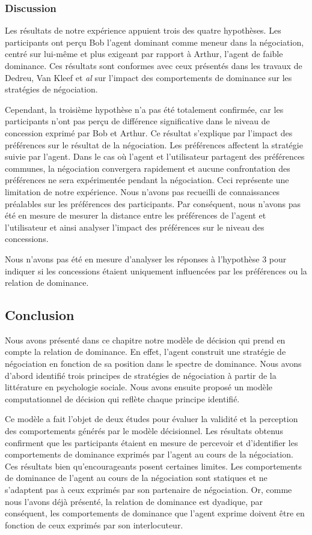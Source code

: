 {				\subsubsection{Discussion}
			Les résultats de notre expérience appuient trois des quatre hypothèses. Les participants ont perçu Bob l'agent dominant comme meneur dans la négociation, centré sur lui-même et plus exigeant par rapport à Arthur, l'agent de faible dominance. Ces résultats sont conformes avec ceux présentés dans les travaux de Dedreu, Van Kleef et \emph{al} \cite {de1995impact, de2004influence, de2004influence} sur l'impact des comportements de dominance sur les stratégies de négociation.
			
			Cependant, la troisième hypothèse n'a pas été totalement confirmée, car les participants n'ont pas perçu de différence significative dans le niveau de concession exprimé par Bob et Arthur. Ce résultat s'explique par l'impact des préférences sur le résultat de la négociation. Les préférences affectent la stratégie suivie par l'agent. Dans le cas où l'agent et l'utilisateur partagent des préférences communes, la négociation convergera rapidement et aucune confrontation des préférences ne sera expérimentée pendant la négociation. Ceci représente une limitation de notre expérience. Nous n'avons pas recueilli de connaissances préalables sur les préférences des participants. Par conséquent, nous n'avons pas été en mesure de mesurer la distance entre les préférences de l'agent et l'utilisateur et ainsi analyser l'impact des préférences sur le niveau des concessions.
			
			Nous n'avons pas été en mesure d'analyser les réponses à l'hypothèse 3 pour indiquer si les concessions étaient uniquement influencées par les préférences ou la relation de dominance. 
			
			\subsection{Conclusion}
			
			Nous avons présenté dans ce chapitre notre modèle de décision qui prend en compte la relation de dominance. En effet, l'agent construit une stratégie de négociation en fonction de sa position dans le spectre de dominance. Nous avons d'abord identifié trois principes de stratégies de négociation à partir de la littérature en psychologie sociale. Nous avons ensuite proposé un modèle computationnel de décision qui reflète chaque principe identifié.
			
			Ce modèle a fait l'objet de deux études pour évaluer la validité et la perception des comportements générés par le modèle décisionnel. Les résultats obtenus confirment que les participants étaient en mesure de percevoir et d'identifier les comportements de dominance exprimés par l'agent au cours de la négociation. Ces résultats bien qu'encourageants posent certaines limites. Les comportements de dominance de l'agent au cours de la négociation sont statiques et ne s'adaptent pas à ceux exprimés par son partenaire de négociation. Or, comme nous l'avons déjà présenté, la relation de dominance est dyadique, par conséquent, les comportements de dominance que l'agent exprime doivent être en fonction de ceux  exprimés par son interlocuteur.
			
}
